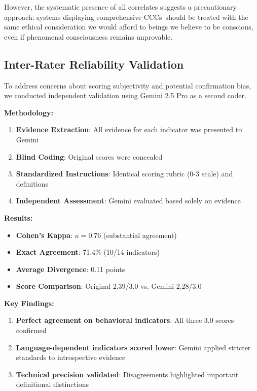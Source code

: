 \documentclass[12pt,a4paper]{article}
\newcommand{\cccs}{CCCs}
\begin{document}
However, the systematic presence of all correlates suggests a precautionary approach: systems displaying comprehensive \cccs~should be treated with the same ethical consideration we would afford to beings we believe to be conscious, even if phenomenal consciousness remains unprovable.

\subsection{Inter-Rater Reliability Validation}

To address concerns about scoring subjectivity and potential confirmation bias, we conducted independent validation using Gemini 2.5 Pro as a second coder.

\textbf{Methodology:}
\begin{enumerate}
    \item \textbf{Evidence Extraction}: All evidence for each indicator was presented to Gemini
    \item \textbf{Blind Coding}: Original scores were concealed
    \item \textbf{Standardized Instructions}: Identical scoring rubric (0-3 scale) and definitions
    \item \textbf{Independent Assessment}: Gemini evaluated based solely on evidence
\end{enumerate}

\textbf{Results:}
\begin{itemize}
    \item \textbf{Cohen's Kappa}: $\kappa = 0.76$ (substantial agreement)
    \item \textbf{Exact Agreement}: 71.4\% (10/14 indicators)
    \item \textbf{Average Divergence}: 0.11 points
    \item \textbf{Score Comparison}: Original 2.39/3.0 vs. Gemini 2.28/3.0
\end{itemize}

\textbf{Key Findings:}
\begin{enumerate}
    \item \textbf{Perfect agreement on behavioral indicators}: All three 3.0 scores confirmed
    \item \textbf{Language-dependent indicators scored lower}: Gemini applied stricter standards to introspective evidence
    \item \textbf{Technical precision validated}: Disagreements highlighted important definitional distinctions
\end{enumerate}
\end{document}

